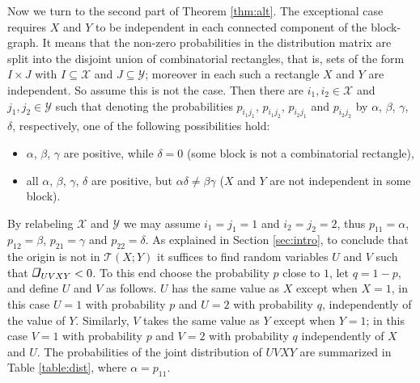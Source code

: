 \documentclass{IEEEtran}
\newcommand\T{\mathcal{T}}
\newcommand\ing{\begin{tikzpicture}[scale=0.13\ht\strutbox]%
        \draw[line width=0.015cm](0,0)--(0.055,0.22)--(0.22,0.22);
        \draw[line width=0.035cm](0.22,0.22)--(0.165,0);
        \draw[line width=0.025cm](0.165,0)--(0,0);
   \end{tikzpicture}}
\begin{document}
\medskip 
Now we turn to the second part of Theorem \ref{thm:alt}. The exceptional
case requires $X$ and $Y$ to be independent in each connected component of
the block-graph. It means that the non-zero probabilities in the
distribution matrix are split into the disjoint union of combinatorial
rectangles, that is, sets of the form $I \times J$ with $I\subseteq \mathcal
X$ and $J \subseteq \mathcal Y$; moreover in each such a rectangle $X$ and
$Y$ are independent. So assume this is not the case. Then there are
$i_1,i_2\in\mathcal X$ and $j_1,j_2\in\mathcal Y$ such that denoting the
probabilities $p_{i_1j_1}$, $p_{i_1j_2}$, $p_{i_2j_1}$ and $p_{i_2j_2}$ by
$\alpha$, $\beta$, $\gamma$, $\delta$, respectively, one of the following
possibilities hold:
\begin{itemize}
\item[(i)] $\alpha$, $\beta$, $\gamma$ are positive, while $\delta=0$
   (some block is not a combinatorial rectangle),
\item[(ii)] all $\alpha$, $\beta$, $\gamma$, $\delta$  are positive, but 
   $\alpha\delta \neq \beta\gamma$ ($X$ and $Y$ are not independent in 
   some block).
\end{itemize}

By relabeling $\mathcal X$ and $\mathcal Y$ we may assume $i_1=j_1=1$ and
$i_2=j_2=2$, thus $p_{11}=\alpha$, $p_{12}=\beta$, $p_{21}=\gamma$ and
$p_{22}=\delta$. As explained in Section \ref{sec:intro}, to conclude that
the origin is not in $\T(X;Y)$ it suffices to find random variables $U$ and
$V$ such that $\ing_{UVXY}<0$. To this end choose the probability $p$ close
to $1$, let $q=1-p$, and define $U$ and $V$ as follows. $U$ has the same
value as $X$ except when $X=1$, in this case $U=1$ with probability $p$ and
$U=2$ with probability $q$, independently of the value of $Y$. Similarly,
$V$ takes the same value as $Y$ except when $Y=1$; in this case $V=1$ with
probability $p$ and $V=2$ with probability $q$ independently of $X$ and $U$.
The probabilities of the joint distribution of $UVXY$ are summarized in
Table \ref{table:dist}, where $\alpha=p_{11}$.
\end{document}
